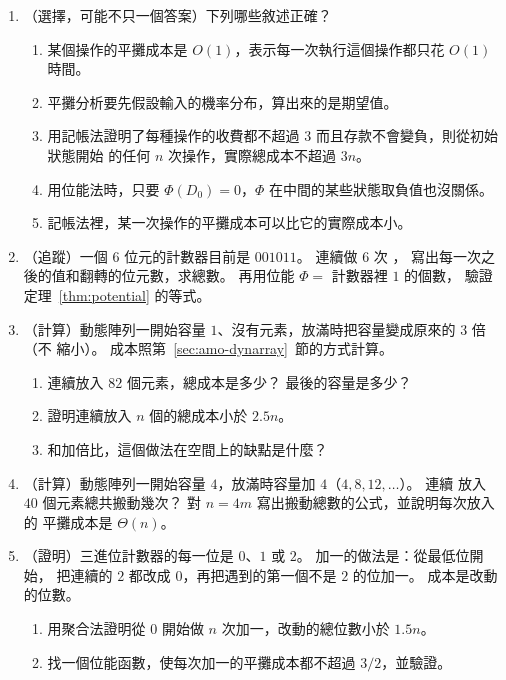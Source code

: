 \begin{enumerate}
\item （選擇，可能不只一個答案）下列哪些敘述正確？
\begin{enumerate}
\item 某個操作的平攤成本是 $O(1)$，表示每一次執行這個操作都只花 $O(1)$ 時間。
\item 平攤分析要先假設輸入的機率分布，算出來的是期望值。
\item 用記帳法證明了每種操作的收費都不超過 $3$ 而且存款不會變負，則從初始狀態開始
的任何 $n$ 次操作，實際總成本不超過 $3n$。
\item 用位能法時，只要 $\Phi(D_0) = 0$，$\Phi$ 在中間的某些狀態取負值也沒關係。
\item 記帳法裡，某一次操作的平攤成本可以比它的實際成本小。
\end{enumerate}

\item \label{amo-q-counter}（追蹤）一個 $6$ 位元的計數器目前是 $001011$。 連續做 $6$ 次 ，
寫出每一次之後的值和翻轉的位元數，求總數。 再用位能 $\Phi = $ 計數器裡 $1$ 的個數，
驗證定理~\ref{thm:potential} 的等式。

\item \label{amo-q-triple}（計算）動態陣列一開始容量 $1$、沒有元素，放滿時把容量變成原來的 $3$ 倍（不
縮小）。 成本照第~\ref{sec:amo-dynarray}~節的方式計算。
\begin{enumerate}
\item 連續放入 $82$ 個元素，總成本是多少？ 最後的容量是多少？
\item 證明連續放入 $n$ 個的總成本小於 $2.5n$。
\item 和加倍比，這個做法在空間上的缺點是什麼？
\end{enumerate}

\item \label{amo-q-add4}（計算）動態陣列一開始容量 $4$，放滿時容量加 $4$（$4, 8, 12, \ldots$）。 連續
放入 $40$ 個元素總共搬動幾次？ 對 $n = 4m$ 寫出搬動總數的公式，並說明每次放入的
平攤成本是 $\Theta(n)$。

\item （證明）三進位計數器的每一位是 $0$、$1$ 或 $2$。 加一的做法是：從最低位開始，
把連續的 $2$ 都改成 $0$，再把遇到的第一個不是 $2$ 的位加一。 成本是改動的位數。
\begin{enumerate}
\item 用聚合法證明從 $0$ 開始做 $n$ 次加一，改動的總位數小於 $1.5n$。
\item 找一個位能函數，使每次加一的平攤成本都不超過 $3/2$，並驗證。
\end{enumerate}


\end{enumerate}
